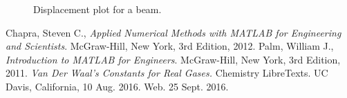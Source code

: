 \documentclass{article}
\begin{document}
\begin{figure}[ht!]
\begin{center}
\caption{Displacement plot for a beam.}
\end{center}
\end{figure}
\clearpage

\begin{thebibliography}{9}
  Chapra, Steven C.,
  {\it Applied Numerical Methods with MATLAB for Engineering and Scientists}.
  McGraw-Hill, New York,
  3rd Edition,
  2012.
  Palm, William J.,
  {\it Introduction to MATLAB for Engineers}.
  McGraw-Hill, New York,
  3rd Edition,
  2011.
   {\it Van Der Waal's Constants for Real Gases.} 
   Chemistry LibreTexts. 
   UC Davis, California,
   10 Aug. 2016. Web. 25 Sept. 2016.
\end{thebibliography}
\end{document}
